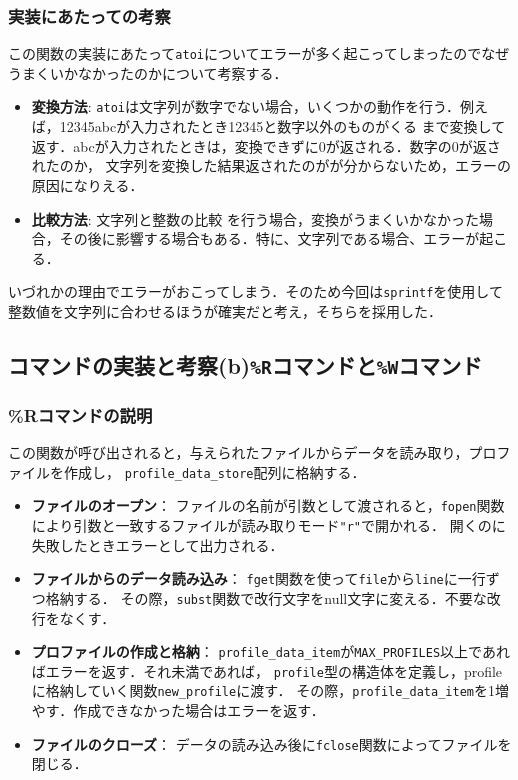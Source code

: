     \subsubsection{実装にあたっての考察}
    この関数の実装にあたって\texttt{atoi}についてエラーが多く起こってしまったのでなぜうまくいかなかったのかについて考察する．
    \begin{itemize}
      \item \textbf{変換方法}:
        \texttt{atoi}は文字列が数字でない場合，いくつかの動作を行う．例えば，12345abcが入力されたとき12345と数字以外のものがくる
        まで変換して返す．abcが入力されたときは，変換できずに0が返される．数字の0が返されたのか，
        文字列を変換した結果返されたのがが分からないため，エラーの原因になりえる．
      \item \textbf{比較方法}:
        文字列と整数の比較
        を行う場合，変換がうまくいかなかった場合，その後に影響する場合もある．特に、文字列である場合、エラーが起こる．
    \end{itemize}
    いづれかの理由でエラーがおこってしまう．そのため今回は\texttt{sprintf}を使用して
    整数値を文字列に合わせるほうが確実だと考え，そちらを採用した．
\clearpage
  \subsection{コマンドの実装と考察(b)\texttt{\%R}コマンドと\texttt{\%W}コマンド}
    \subsubsection{\%Rコマンドの説明}
    この関数が呼び出されると，与えられたファイルからデータを読み取り，プロファイルを作成し，
    \texttt{profile\_data\_store}配列に格納する．
    \begin{itemize}
      \item\textbf{ファイルのオープン}：
      ファイルの名前が引数として渡されると，\texttt{fopen}関数により引数と一致するファイルが読み取りモード\texttt{"r"}で開かれる．
      開くのに失敗したときエラーとして出力される．
      \item\textbf{ファイルからのデータ読み込み}：
      \texttt{fget}関数を使って\texttt{file}から\texttt{line}に一行ずつ格納する．
      その際，\texttt{subst}関数で改行文字をnull文字に変える．不要な改行をなくす．
      \item \textbf{プロファイルの作成と格納}：
      \texttt{profile\_data\_item}が\texttt{MAX\_PROFILES}以上であればエラーを返す．それ未満であれば，
      \texttt{profile}型の構造体を定義し，profileに格納していく関数\texttt{new\_profile}に渡す．
      その際，\texttt{profile\_data\_item}を1増やす．作成できなかった場合はエラーを返す．
      \item \textbf{ファイルのクローズ}：
      データの読み込み後に\texttt{fclose}関数によってファイルを閉じる．


    \end{itemize}
